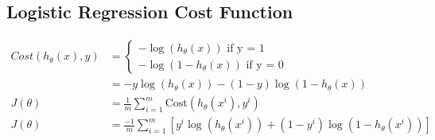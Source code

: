 \documentclass[11pt, oneside]{article}
\begin{document}
\subsection{Logistic Regression Cost Function}
	\begin{align*}
		Cost(h_\theta(x), y) &= 
			\begin{cases} 
				-\log(h_\theta(x)) \text{ if y = 1 } \\
				-\log(1 - h_\theta(x)) \text{ if y = 0}
			\end{cases}\\
		&= -y\log(h_\theta(x)) - (1-y)\log(1 - h_\theta(x)) \\
		J(\theta) &= \frac{1}{m} \sum^m_{i=1}\text{Cost}(h_\theta(x^i),y^i) \\
		J(\theta) &= \frac{-1}{m} \sum^m_{i=1} \left[y^i\log(h_\theta(x^i)) + (1-y^i)\log(1 - h_\theta(x^i))\right] 
	\end{align*}
\iffalse
	\begin{figure}[!h]
		\begin{subfigure}{.5\textwidth}
			\centering
			\begin{tikzpicture}[scale=0.6]
				\begin{axis}[
					axis lines = left,
					xmin=0, xmax=1, ymin=0, ymax=1,
					xlabel = $h_\theta(x)$,
					ylabel = {$f(x)$},
				]
				\addplot [
					domain=0:1,
					samples=100, 
					color=red,
				]
				{-ln(x)/ln(10)};
				\end{axis}
			\end{tikzpicture}
			\caption{if y=1}
			\label{fig:sub1}
		\end{subfigure}%
		\begin{subfigure}{.5\textwidth}
			\centering
			\begin{tikzpicture}[scale=0.6]
				\begin{axis}[
					axis lines = left,
					xmin=0, xmax=1, ymin=0, ymax=1,
					xlabel = $h_\theta(x)$,
					ylabel = {$f(x)$},
				]
				\addplot [
					domain=0:1,
					samples=100, 
					color=red,
				]
				{-ln(1-x)/ln(10)};
				\end{axis}
			\end{tikzpicture}
			\caption{if y=0}
			\label{fig:sub2}
		\end{subfigure}
	\end{figure}
\fi
\end{document}
